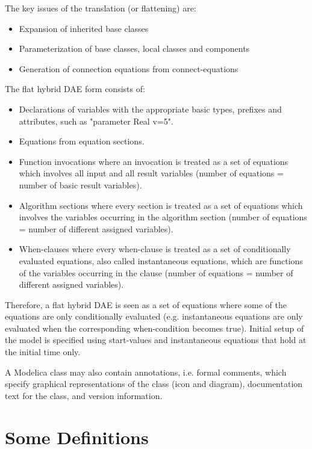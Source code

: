 \documentclass[10pt,a4paper]{report}
\begin{document}
The key issues of the translation (or flattening) are:

\begin{itemize}
\item
  Expansion of inherited base classes
\item
  Parameterization of base classes, local classes and components
\item
  Generation of connection equations from connect-equations
\end{itemize}

The flat hybrid DAE form consists of:

\begin{itemize}
\item
  Declarations of variables with the appropriate basic types, prefixes
  and attributes, such as "parameter Real v=5".
\item
  Equations from equation sections.
\item
  Function invocations where an invocation is treated as a set of
  equations which involves all input and all result variables (number of
  equations = number of basic result variables).
\item
  Algorithm sections where every section is treated as a set of
  equations which involves the variables occurring in the algorithm
  section (number of equations = number of different assigned
  variables).
\item
  When-clauses where every when-clause is treated as a set of
  conditionally evaluated equations, also called instantaneous
  equations, which are functions of the variables occurring in the
  clause (number of equations = number of different assigned variables).
\end{itemize}

Therefore, a flat hybrid DAE is seen as a set of equations where some of
the equations are only conditionally evaluated (e.g. instantaneous
equations are only evaluated when the corresponding when-condition
becomes true). Initial setup of the model is specified using
start-values and instantaneous equations that hold at the initial time
only.

A Modelica class may also contain annotations, i.e. formal comments,
which specify graphical representations of the class (icon and diagram),
documentation text for the class, and version information.

\section{Some Definitions}
\end{document}
